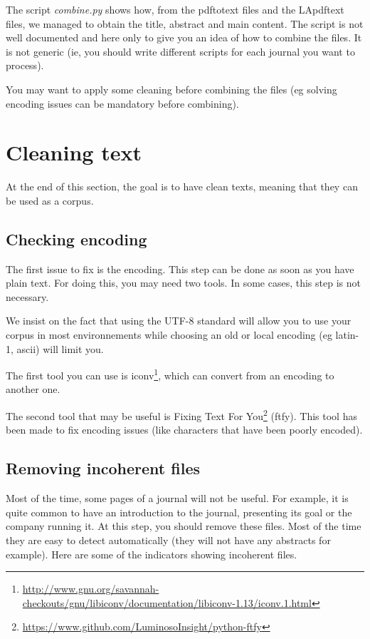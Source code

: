 \documentclass[a4paper,10pt]{article}
\begin{document}
The script \emph{combine.py} shows how, from the pdftotext files and
the LApdftext files, we managed to obtain the title, abstract and main
content. The script is not well documented and here only to give you
an idea of how to combine the files. It is not generic (ie, you should
write different scripts for each journal you want to process).

You may want to apply some cleaning before combining the files (eg
solving encoding issues can be mandatory before combining).


\section{Cleaning text}
\label{sec:cleaning}

At the end of this section, the goal is to have clean texts, meaning
that they can be used as a corpus.

\subsection{Checking encoding}
\label{sec:encoding}

The first issue to fix is the encoding. This step can be done as soon
as you have plain text. For doing this, you may need two tools. In
some cases, this step is not necessary.

We insist on the fact that using the UTF-8 standard will allow you to
use your corpus in most environnements while choosing an old or local
encoding (eg latin-1, ascii) will limit you.

The first tool you can use is
iconv\footnote{\url{http://www.gnu.org/savannah-checkouts/gnu/libiconv/documentation/libiconv-1.13/iconv.1.html}},
which can convert from an encoding to another one.

The second tool that may be useful is Fixing Text For
You\footnote{\url{https://www.github.com/LuminosoInsight/python-ftfy}}
(ftfy). This tool has been made to fix encoding issues (like
characters that have been poorly encoded).

\subsection{Removing incoherent files}
\label{sec:incoherent}

Most of the time, some pages of a journal will not be useful. For
example, it is quite common to have an introduction to the journal,
presenting its goal or the company running it. At this step, you
should remove these files.  Most of the time they are easy to detect
automatically (they will not have any abstracts for example). Here are
some of the indicators showing incoherent files.
\end{document}
